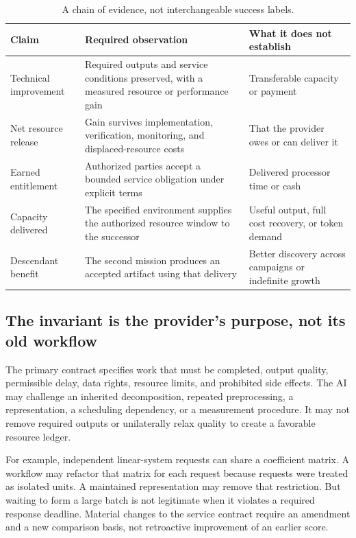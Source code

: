 \documentclass[11pt,letterpaper]{article}
\theoremstyle{remark}\newtheorem{remark}{Remark}[section]
\begin{document}
\begin{table}[htbp]\centering\small
\caption{A chain of evidence, not interchangeable success labels.}\label{tab:claims}
\begin{tabularx}{\linewidth}{@{}P{.17\linewidth}YY@{}}
\toprule
Claim & Required observation & What it does not establish\\\midrule
Technical improvement & Required outputs and service conditions preserved, with a measured resource or performance gain & Transferable capacity or payment\\
Net resource release & Gain survives implementation, verification, monitoring, and displaced-resource costs & That the provider owes or can deliver it\\
Earned entitlement & Authorized parties accept a bounded service obligation under explicit terms & Delivered processor time or cash\\
Capacity delivered & The specified environment supplies the authorized resource window to the successor & Useful output, full cost recovery, or token demand\\
Descendant benefit & The second mission produces an accepted artifact using that delivery & Better discovery across campaigns or indefinite growth\\\bottomrule
\end{tabularx}
\end{table}

\subsection{The invariant is the provider's purpose, not its old workflow}
The primary contract specifies work that must be completed, output quality, permissible delay, data rights, resource limits, and prohibited side effects. The AI may challenge an inherited decomposition, repeated preprocessing, a representation, a scheduling dependency, or a measurement procedure. It may not remove required outputs or unilaterally relax quality to create a favorable resource ledger.

For example, independent linear-system requests can share a coefficient matrix. A workflow may refactor that matrix for each request because requests were treated as isolated units. A maintained representation may remove that restriction. But waiting to form a large batch is not legitimate when it violates a required response deadline. Material changes to the service contract require an amendment and a new comparison basis, not retroactive improvement of an earlier score.
\end{document}
